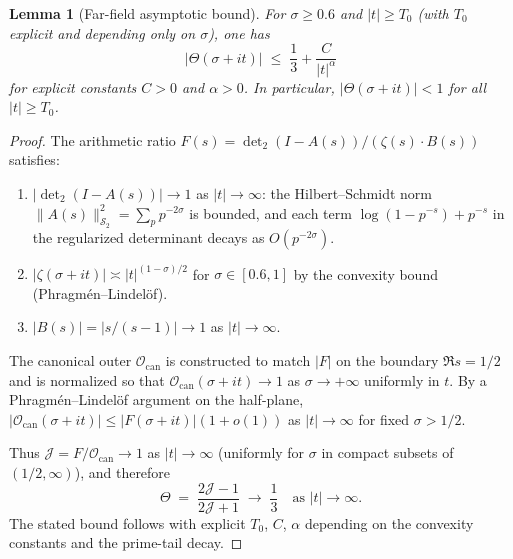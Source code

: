 \documentclass[11pt]{article}
\newtheorem{lemma}[theorem]{Lemma}
\theoremstyle{definition}
\theoremstyle{remark}
\theoremstyle{definition}
\newcommand{\HS}{\mathcal{S}_2}
\begin{document}
\begin{lemma}[Far-field asymptotic bound]\label{lem:theta-asymptotic}
For $\sigma \ge 0.6$ and $|t| \ge T_0$ (with $T_0$ explicit and depending only on $\sigma$), one has
\[
  |\Theta(\sigma + it)| \;\le\; \frac{1}{3} + \frac{C}{|t|^\alpha}
\]
for explicit constants $C > 0$ and $\alpha > 0$. In particular, $|\Theta(\sigma+it)| < 1$ for all $|t| \ge T_0$.
\end{lemma}
\begin{proof}
The arithmetic ratio $F(s) = \det_2(I-A(s)) / (\zeta(s) \cdot B(s))$ satisfies:
\begin{enumerate}
\item $|\det_2(I-A(s))| \to 1$ as $|t| \to \infty$: the Hilbert--Schmidt norm $\|A(s)\|_{\HS}^2 = \sum_p p^{-2\sigma}$ is bounded, and each term $\log(1-p^{-s})+p^{-s}$ in the regularized determinant decays as $O(p^{-2\sigma})$.
\item $|\zeta(\sigma+it)| \asymp |t|^{(1-\sigma)/2}$ for $\sigma \in [0.6, 1]$ by the convexity bound (Phragm\'en--Lindel\"of).
\item $|B(s)| = |s/(s-1)| \to 1$ as $|t| \to \infty$.
\end{enumerate}
The canonical outer $\mathcal{O}_{\mathrm{can}}$ is constructed to match $|F|$ on the boundary $\Re s = 1/2$ and is normalized so that $\mathcal{O}_{\mathrm{can}}(\sigma+it) \to 1$ as $\sigma \to +\infty$ uniformly in $t$. By a Phragm\'en--Lindel\"of argument on the half-plane, $|\mathcal{O}_{\mathrm{can}}(\sigma+it)| \le |F(\sigma+it)|(1+o(1))$ as $|t| \to \infty$ for fixed $\sigma > 1/2$.

Thus $\mathcal{J} = F / \mathcal{O}_{\mathrm{can}} \to 1$ as $|t| \to \infty$ (uniformly for $\sigma$ in compact subsets of $(1/2, \infty)$), and therefore
\[
  \Theta \;=\; \frac{2\mathcal{J}-1}{2\mathcal{J}+1} \;\longrightarrow\; \frac{1}{3}
  \quad\text{as }|t|\to\infty.
\]
The stated bound follows with explicit $T_0$, $C$, $\alpha$ depending on the convexity constants and the prime-tail decay.
\end{proof}
\end{document}
